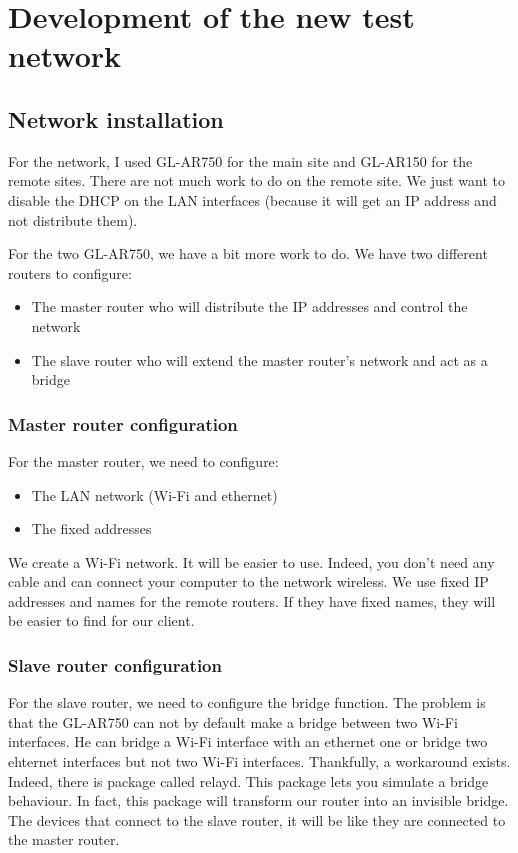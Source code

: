 \chapter{Development of the new test network}


\section{Network installation}

For the network, I used GL-AR750 for the main site and GL-AR150 for the remote sites. There are not much work to do on the remote site. We just want to disable the DHCP on the LAN interfaces (because it will get an IP address and not distribute them).

For the two GL-AR750, we have a bit more work to do. We have two different routers to configure:
\begin{itemize}
	\item The master router who will distribute the IP addresses and control the network
	\item The slave router who will extend the master router's network and act as a bridge
\end{itemize}

\subsection{Master router configuration}

For the master router, we need to configure:
\begin{itemize}
	\item The LAN network (Wi-Fi and ethernet)
	\item The fixed addresses
\end{itemize}


We create a Wi-Fi network. It will be easier to use. Indeed, you don't need any cable and can connect your computer to the network wireless. We use fixed IP addresses and names for the remote routers. If they have fixed names, they will be easier to find for our client.


\subsection{Slave router configuration}

For the slave router, we need to configure the bridge function. The problem is that the GL-AR750 can not by default make a bridge between two Wi-Fi interfaces. He can bridge a Wi-Fi interface with an ethernet one or bridge two ehternet interfaces but not two Wi-Fi interfaces. Thankfully, a workaround exists. Indeed, there is package called relayd. This package lets you simulate a bridge behaviour. In fact, this package will transform our router into an invisible bridge. The devices that connect to the slave router, it will be like they are connected to the master router.


